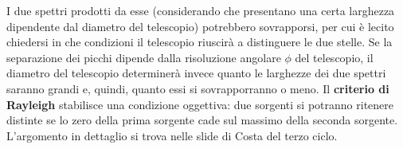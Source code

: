 I due spettri prodotti da esse (considerando che presentano una certa larghezza dipendente dal diametro del telescopio) potrebbero sovrapporsi, per cui è lecito chiedersi in che condizioni il telescopio riuscirà a distinguere le due stelle. Se la separazione dei picchi dipende dalla risoluzione angolare $\phi$ del telescopio, il diametro del telescopio determinerà invece quanto le larghezze dei due spettri saranno grandi e, quindi, quanto essi si sovrapporranno o meno. Il \textbf{criterio di Rayleigh} stabilisce una condizione oggettiva: due sorgenti si potranno ritenere distinte se lo zero della prima sorgente cade sul massimo della seconda sorgente. L'argomento in dettaglio si trova nelle slide di Costa del terzo ciclo.